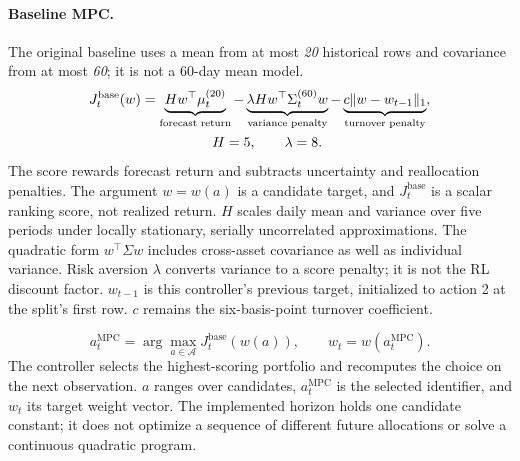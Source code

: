 \paragraph{Baseline MPC.}
The original baseline uses a mean from at most \emph{20} historical rows and covariance from at most \emph{60}; it is not a 60-day mean model.
\begin{equation}
\begin{aligned}
J_t^{\mathrm{base}}(w)
&=\underbrace{Hw^\top\mu_t^{(20)}}_{\text{forecast return}}
-\underbrace{\lambda H w^\top\Sigma_t^{(60)}w}_{\text{variance penalty}}
-\underbrace{c\|w-w_{t-1}\|_1}_{\text{turnover penalty}},\\
&\hspace{18mm}H=5,\qquad\lambda=8.
\end{aligned}
\label{eq:mpc-baseline-detailed}
\end{equation}
The score rewards forecast return and subtracts uncertainty and reallocation penalties.
The argument $w=w(a)$ is a candidate target, and $J_t^{\mathrm{base}}$ is a scalar ranking score, not realized return. $H$ scales daily mean and variance over five periods under locally stationary, serially uncorrelated approximations. The quadratic form $w^\top\Sigma w$ includes cross-asset covariance as well as individual variance. Risk aversion $\lambda$ converts variance to a score penalty; it is not the RL discount factor. $w_{t-1}$ is this controller's previous target, initialized to action 2 at the split's first row. $c$ remains the six-basis-point turnover coefficient.

\begin{equation}
a_t^{\mathrm{MPC}}=\arg\max_{a\in\mathcal A}J_t^{\mathrm{base}}(w(a)),
\qquad w_t=w(a_t^{\mathrm{MPC}}).
\label{eq:mpc-choice-detailed}
\end{equation}
The controller selects the highest-scoring portfolio and recomputes the choice on the next observation.
$a$ ranges over candidates, $a_t^{\mathrm{MPC}}$ is the selected identifier, and $w_t$ its target weight vector. The implemented horizon holds one candidate constant; it does not optimize a sequence of different future allocations or solve a continuous quadratic program.

